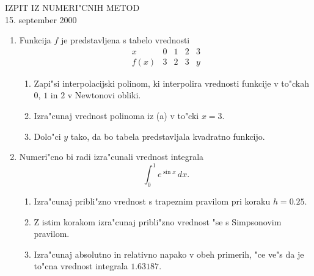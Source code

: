 
\begin{center}
  IZPIT IZ NUMERI"CNIH METOD\\
  15. september 2000
\end{center}
\begin{enumerate}

  \item Funkcija $f$ je predstavljena s tabelo vrednosti
    $$
    \begin{array}{c|ccc|c}
      x&0&1&2&3\\
      \hline
      f(x)&3&2&3&y
    \end{array}
    $$
  \begin{enumerate}
    \item Zapi"si interpolacijski polinom, ki interpolira vrednosti funkcije
    v to"ckah $0$, $1$ in $2$ v Newtonovi obliki.
    \item Izra"cunaj vrednost polinoma iz (a) v to"cki $x=3$.
    \item Dolo"ci $y$ tako, da bo tabela predstavljala kvadratno 
    funkcijo.
  \end{enumerate}

  \item Numeri"cno bi radi izra"cunali vrednost integrala
    $$\int_0^1 e^{\sin{x}}\,dx.$$
  \begin{enumerate}
      \item Izra"cunaj pribli"zno vrednost s trapeznim pravilom pri koraku
      $h=0.25$.
      \item Z istim korakom izra"cunaj pribli"zno vrednost "se s Simpsonovim
        pravilom.
      \item Izra"cunaj absolutno in relativno napako v obeh primerih, "ce ve"s
        da je to"cna vrednost integrala $1.63187$.
  \end{enumerate}

\end{enumerate}



